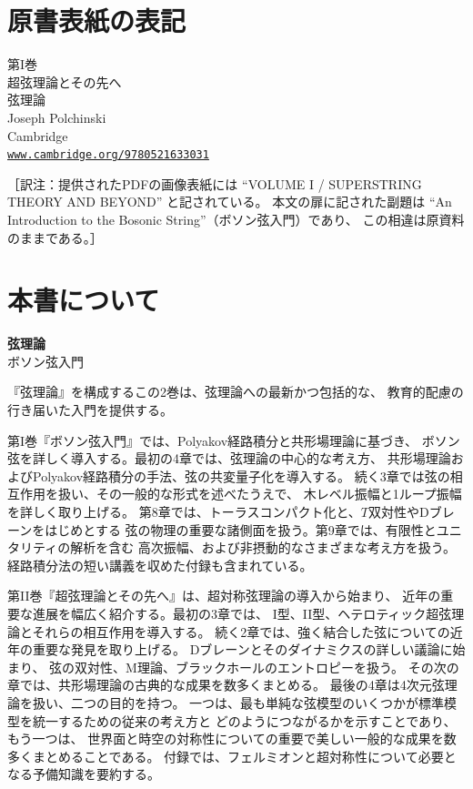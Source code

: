 
\section*{原書表紙の表記}
\begin{center}
第I巻\\
超弦理論とその先へ\\[1ex]
{\Large 弦理論}\\[1ex]
Joseph Polchinski\\
Cambridge\\
\href{https://www.cambridge.org/9780521633031}{\nolinkurl{www.cambridge.org/9780521633031}}
\end{center}
\noindent
［訳注：提供されたPDFの画像表紙には
``VOLUME I / SUPERSTRING THEORY AND BEYOND'' と記されている。
本文の扉に記された副題は
``An Introduction to the Bosonic String''（ボソン弦入門）であり、
この相違は原資料のままである。］

\section*{本書について}
\begin{center}
\textbf{弦理論}\\
ボソン弦入門
\end{center}

『弦理論』を構成するこの2巻は、弦理論への最新かつ包括的な、
教育的配慮の行き届いた入門を提供する。

第I巻『ボソン弦入門』では、Polyakov経路積分と共形場理論に基づき、
ボソン弦を詳しく導入する。最初の4章では、弦理論の中心的な考え方、
共形場理論およびPolyakov経路積分の手法、弦の共変量子化を導入する。
続く3章では弦の相互作用を扱い、その一般的な形式を述べたうえで、
木レベル振幅と1ループ振幅を詳しく取り上げる。
第8章では、トーラスコンパクト化と、$T$双対性やDブレーンをはじめとする
弦の物理の重要な諸側面を扱う。第9章では、有限性とユニタリティの解析を含む
高次振幅、および非摂動的なさまざまな考え方を扱う。
経路積分法の短い講義を収めた付録も含まれている。

第II巻『超弦理論とその先へ』は、超対称弦理論の導入から始まり、
近年の重要な進展を幅広く紹介する。最初の3章では、
I型、II型、ヘテロティック超弦理論とそれらの相互作用を導入する。
続く2章では、強く結合した弦についての近年の重要な発見を取り上げる。
Dブレーンとそのダイナミクスの詳しい議論に始まり、
弦の双対性、M理論、ブラックホールのエントロピーを扱う。
その次の章では、共形場理論の古典的な成果を数多くまとめる。
最後の4章は4次元弦理論を扱い、二つの目的を持つ。
一つは、最も単純な弦模型のいくつかが標準模型を統一するための従来の考え方と
どのようにつながるかを示すことであり、もう一つは、
世界面と時空の対称性についての重要で美しい一般的な成果を数多くまとめることである。
付録では、フェルミオンと超対称性について必要となる予備知識を要約する。

